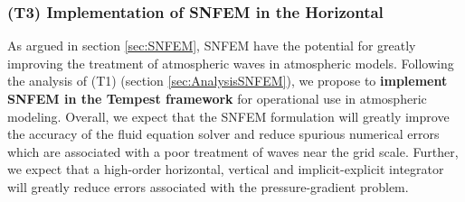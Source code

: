 \documentclass[11pt]{article}
\begin{document}


\subsubsection{(T3) Implementation of SNFEM in the Horizontal} \label{sec:HorizontalSNFEM}

As argued in section \ref{sec:SNFEM}, SNFEM have the potential for greatly improving the treatment of atmospheric waves in atmospheric models.  Following the analysis of (T1) (section \ref{sec:AnalysisSNFEM}), we propose to \textbf{implement SNFEM in the Tempest framework} for operational use in atmospheric modeling.  Overall, we expect that the SNFEM formulation will greatly improve the accuracy of the fluid equation solver and reduce spurious numerical errors which are associated with a poor treatment of waves near the grid scale.  Further, we expect that a high-order horizontal, vertical and implicit-explicit integrator will greatly reduce errors associated with the pressure-gradient problem.

\end{document}
